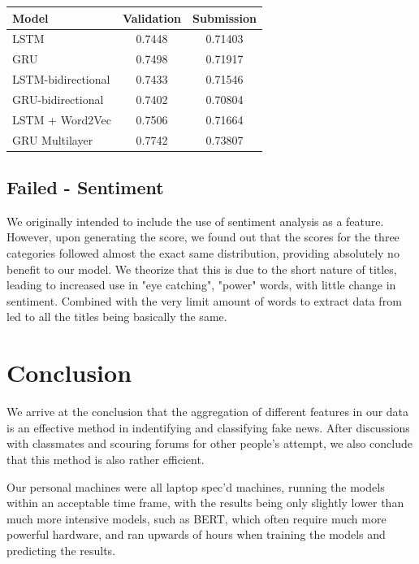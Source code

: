 \documentclass[a4paper, 12pt]{article}
\begin{document}
\begin{multicols}{2}
            \begin{center}
                \begin{tabular}{l|cc}
                    Model & Validation & Submission \\
                    \hline
                    LSTM & 0.7448 & 0.71403 \\
                    GRU & 0.7498 & 0.71917 \\
                    LSTM-bidirectional & 0.7433 & 0.71546 \\
                    GRU-bidirectional & 0.7402 & 0.70804 \\
                    LSTM + Word2Vec & 0.7506 & 0.71664 \\
                    GRU Multilayer & 0.7742 & 0.73807
                \end{tabular}
                \label{rnn_results}
            \end{center}

        \subsection{Failed - Sentiment}
            We originally intended to include the use of sentiment analysis as a feature. However, upon generating the score, we found out that the scores for the three categories followed almost the exact same distribution, providing absolutely no benefit to our model. We theorize that this is due to the short nature of titles, leading to increased use in "eye catching", "power" words, with little change in sentiment. Combined with the very limit amount of words to extract data from led to all the titles being basically the same.
        
    \end{multicols}
    \newpage
    \section{Conclusion}
        We arrive at the conclusion that the aggregation of different features in our data is an effective method in indentifying and classifying fake news. After discussions with classmates and scouring forums for other people's attempt, we also conclude that this method is also rather efficient. 
        
        Our personal machines were all laptop spec'd machines, running the models within an acceptable time frame, with the results being only slightly lower than much more intensive models, such as BERT, which often require much more powerful hardware, and ran upwards of hours when training the models and predicting the results.

        \vskip 5cm
{}

\end{document}
